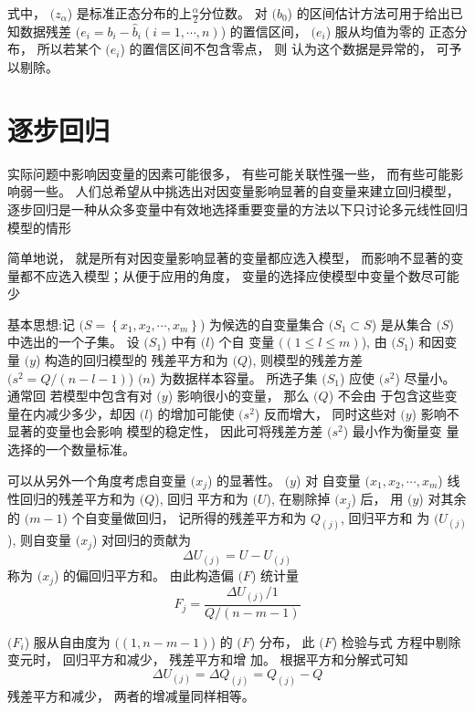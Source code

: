 式中， $( {z}_{\alpha} $) 是标准正态分布的上$\frac{\alpha}{2} $分位数。 
对 $( {b}_{0} $) 的区间估计方法可用于给出已知数据残差 $( {e}_{i}={b}_{{i}}-\hat{{b}}_{{i}}({i}={1}, \cdots, {n}) $) 的置信区间， $( {e}_{i} $) 服从均值为零的
正态分布， 所以若某个 $( e_{i} $) 的置信区间不包含零点， 则 认为这个数据是异常的， 可予以剔除。 

\section{逐步回归}

实际问题中影响因变量的因素可能很多， 有些可能关联性强一些， 而有些可能影响弱一些。 人们总希望从中挑选出对因变量影响显著的自变量来建立回归模型， 逐步回归是一种从众多变量中有效地选择重要变量的方法以下只讨论多元线性回归模型的情形

简单地说， 就是所有对因变量影响显著的变量都应选入模型， 而影响不显著的变量都不应选入模型；从便于应用的角度， 变量的选择应使模型中变量个数尽可能少

基本思想:记 $( {S}=\left\{{x}_{1}, {x}_{2}, \cdots, {x}_{m}\right\} $) 为候选的自变量集合
$( {S}_{1} \subset {S} $) 是从集合 $( {S} $) 中选出的一个子集。 设 $( {S}_{1} $) 中有 $( {l} $) 个自
变量 $( (1 \leq l \leq m) $), 由 $( S_{1} $) 和因变量 $( y $) 构造的回归模型的 残差平方和为 $( Q $), 则模型的残差方差 $( {s}^{2}={Q} /({n}-{l}-{1}) $)
$( {n} $) 为数据样本容量。 所选子集 $( {S}_{1} $) 应使 $( {s}^{2} $) 尽量小。 通常回
若模型中包含有对 $( y $) 影响很小的变量， 那么 $( Q $) 不会由 于包含这些变量在内减少多少，却因 $( l $) 的增加可能使 $( s^{2} $) 反而增大， 同时这些对 $( {y} $) 影响不显著的变量也会影响 模型的稳定性， 因此可将残差方差 $( {s}^{2} $) 最小作为衡量变
量选择的一个数量标准。 

可以从另外一个角度考虑自变量 $( {x}_{j} $) 的显著性。  $( {y} $) 对 自变量 $( {x}_{{1}}, {x}_{2}, \cdots, {x}_{m} $) 线性回归的残差平方和为 $( {Q} $), 回归
平方和为 $( U $), 在剔除掉 $( {x}_{j} $) 后， 用 $( {y} $) 对其余的 $( {m}-{1} $) 个自变量做回归， 记所得的残差平方和为 $ Q_{(j)} $, 回归平方和
为 $( U_{(j)} $), 则自变量 $( x_{j} $) 对回归的贡献为
\begin{equation}
\Delta {U}_{(j)}={U}-{U}_{(j)}
\end{equation}
称为 $( {x}_{{j}} $) 的偏回归平方和。 由此构造偏 $( {F} $) 统计量
\begin{equation}
F_{j}=\frac{\Delta U_{(j)} / 1}{Q /(n-m-1)}
\end{equation}

$( {F}_{i} $) 服从自由度为 $( ({1}, {n}-{m}-{1}) $) 的 $( {F} $) 分布， 此 $( {F} $) 检验与式
方程中剔除变元时， 回归平方和减少， 残差平方和增 加。 根据平方和分解式可知
\begin{equation}
\Delta {U}_{(j)}=\Delta {Q}_{(j)}={Q}_{(j)}-{Q}
\end{equation}
残差平方和减少， 两者的增减量同样相等。 

